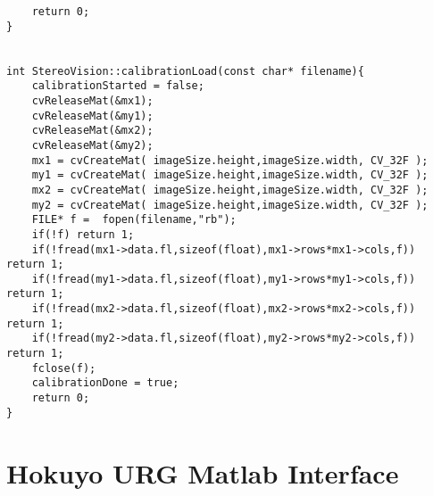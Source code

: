 \begin{lstlisting}
    return 0;
}


int StereoVision::calibrationLoad(const char* filename){
	calibrationStarted = false;
    cvReleaseMat(&mx1);
    cvReleaseMat(&my1);
    cvReleaseMat(&mx2);
    cvReleaseMat(&my2);
    mx1 = cvCreateMat( imageSize.height,imageSize.width, CV_32F );
    my1 = cvCreateMat( imageSize.height,imageSize.width, CV_32F );
    mx2 = cvCreateMat( imageSize.height,imageSize.width, CV_32F );
    my2 = cvCreateMat( imageSize.height,imageSize.width, CV_32F );
    FILE* f =  fopen(filename,"rb");
    if(!f) return 1;
    if(!fread(mx1->data.fl,sizeof(float),mx1->rows*mx1->cols,f)) return 1;
    if(!fread(my1->data.fl,sizeof(float),my1->rows*my1->cols,f)) return 1;
    if(!fread(mx2->data.fl,sizeof(float),mx2->rows*mx2->cols,f)) return 1;
    if(!fread(my2->data.fl,sizeof(float),my2->rows*my2->cols,f)) return 1;
    fclose(f);
    calibrationDone = true;
    return 0;
}

\end{lstlisting}

\section{Hokuyo URG Matlab Interface}


